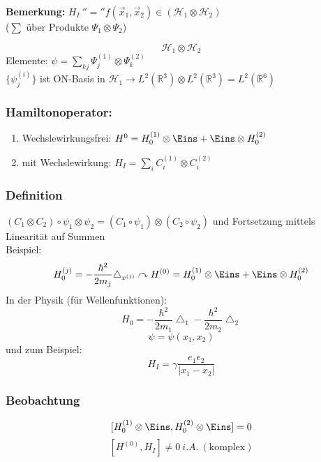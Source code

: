 \documentclass[twoside,a4paper]{scrartcl}
\renewcommand{\1}{\mathds{1}}
\newcommand{\ra}{\rightarrow}
\begin{document}
\textbf{Bemerkung:} $H_I \ ''='' f(\vec x_1, \vec x_2) \in (\mathcal H_1 \otimes \mathcal H_2)$\\
($\sum$ über Produkte $\Psi_1 \otimes \Psi_2$)


$$\mathcal H_1 \otimes \mathcal H_2$$
Elemente: $\psi=\sum_{kj} \Psi_j^{(1)}\otimes \Psi_k^{(2)}$\\
$\{\psi_j^{(i)} \}$ ist ON-Basis in $\mathcal H_1 \ra L^2(\mathbb R^3) \otimes L^2(\mathbb R^3) =L^2(\mathbb R^6)$
\subsubsection*{Hamiltonoperator:}
\begin{enumerate}
 \item Wechslewirkungsfrei: $H^0=H_0^{(1)}\otimes \Eins+\Eins\otimes H_0^{(2)}$
 \item mit Wechslewirkung: $H_I=\sum_i C_i^{(1)}\otimes C_i^{(2)}$
\end{enumerate}
\subsubsection*{Definition}
$(C_1\otimes C_2 ) \circ \psi_1 \otimes \psi_2=(C_1 \circ \psi_1) \otimes (C_2 \circ \psi_2)$ und Fortsetzung mittels Linearität auf Summen\\
Beispiel:
$$H_0^{(j)}=-\frac{\hbar^2}{2m_j} \bigtriangleup_{x^{(j)}} \curvearrowright H^{(0)}=H_0^{(1)}\otimes \Eins+\Eins\otimes H_0^{(2)}$$
In der Physik (für Wellenfunktionen):
$$H_0=-\frac{\hbar^2}{2m_1} \bigtriangleup_{1}-\frac{\hbar^2}{2m_2} \bigtriangleup_{2} $$
$$\psi=\psi(x_1,x_2)$$
und zum Beispiel:
$$H_I=\gamma \frac{e_1e_2}{|x_1-x_2|}$$

\subsubsection*{Beobachtung}
$$[H_0^{(1)} \otimes \Eins, H_0^{(2)} \otimes \Eins]=0$$
$$[H^{(0)},H_I]\neq0 \ i.A. \ \mathrm{(komplex)} $$
\end{document}
